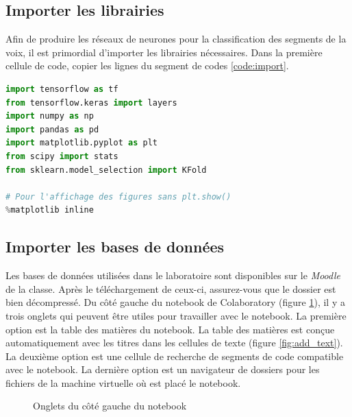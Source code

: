 \documentclass{article}
\begin{document}
\subsection{Importer les librairies}

Afin de produire les réseaux de neurones pour la classification des segments de la voix, il est primordial d'importer les librairies nécessaires. Dans la première cellule de code, copier les lignes du segment de codes \ref{code:import}.

\medbreak

\begin{lstlisting}[language=Python, caption={Importer les librairies}, label={code:import}]
import tensorflow as tf
from tensorflow.keras import layers
import numpy as np
import pandas as pd
import matplotlib.pyplot as plt
from scipy import stats
from sklearn.model_selection import KFold

# Pour l'affichage des figures sans plt.show()
%matplotlib inline
\end{lstlisting}


\subsection{Importer les bases de données}
Les bases de données utilisées dans le laboratoire sont disponibles sur le \textit{Moodle} de la classe. Après le téléchargement de ceux-ci, assurez-vous que le dossier est bien décompressé. Du côté gauche du notebook de Colaboratory (figure \ref{fig:onglet_gauche}), il y a trois onglets qui peuvent être utiles pour travailler avec le notebook. La première option est la table des matières du notebook. La table des matières est conçue automatiquement avec les titres dans les cellules de texte (figure \ref{fig:add_text}). La deuxième option est une cellule de recherche de segments de code compatible avec le notebook. La dernière option est un navigateur de dossiers pour les fichiers de la machine virtuelle où est placé le notebook.

\begin{figure}[H]
  \centering
  \caption{Onglets du côté gauche du notebook}
  \label{fig:onglet_gauche}
\end{figure}
\end{document}
